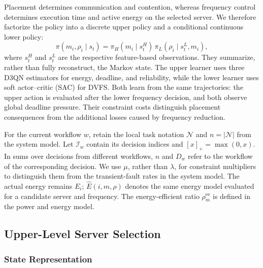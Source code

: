 \documentclass[lettersize,journal]{IEEEtran}
\begin{document}
Placement determines communication and contention, whereas frequency
control determines execution time and active energy on the selected
server. We therefore factorize the policy into a discrete upper policy
and a conditional continuous lower policy:
\begin{equation}
 \pi(m_i,\rho_i\mid s_t)
 =\pi_H(m_i\mid s_t^H)\,
   \pi_L(\rho_i\mid s_t^L,m_i),
 \label{eq:method_factorization}
\end{equation}
where $s_t^H$ and $s_t^L$ are the respective feature-based observations.
They summarize, rather than fully reconstruct, the Markov state.
The upper learner uses three D3QN estimators for energy, deadline, and
reliability, while the lower learner uses soft actor--critic (SAC) for
DVFS. Both learn from the same trajectories: the upper action is evaluated
after the lower frequency decision, and both observe global deadline
pressure. Their constraint costs distinguish placement consequences from
the additional losses caused by frequency reduction.

For the current workflow $w$, retain the local task notation
$\mathcal N$ and $n=|\mathcal N|$ from the system model. Let
$\mathcal I_w$ contain its decision indices and $[x]_+=\max(0,x)$.
In sums over decisions from different workflows, $n$ and $D_w$ refer
to the workflow of the corresponding decision.
We use $\mu$, rather than $\lambda$, for constraint multipliers to
distinguish them from the transient-fault rates in the system model.
The actual energy remains $E_i$; $\widehat E(i,m,\rho)$ denotes the same
energy model evaluated for a candidate server and frequency. The
energy-efficient ratio $\rho_m^{\mathrm{ee}}$ is defined in the power and
energy model.

\subsection{Upper-Level Server Selection}
\label{subsec:high}

\subsubsection{State Representation}
\end{document}

